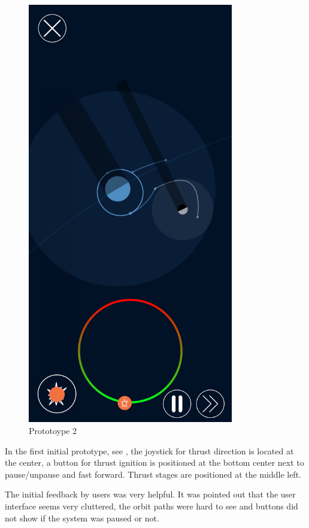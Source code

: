\documentclass[runningheads]{llncs}
\begin{document}
\begin{figure}[!htb]
\begin{minipage}{0.5\textwidth}
      \includegraphics[width=0.8\textwidth]{Prototype2.png}
      \caption{Prototoype 2}
      \label{fig:prot2}
  \end{minipage}
\end{figure}

In the first initial prototype, see , the joystick for thrust direction is located at the center, a button for thrust
ignition is positioned at the bottom center next to pause/unpause and fast forward. Thrust stages are positioned at the middle
left.

The initial feedback by users was very helpful. It was pointed out that the user interface seems very cluttered, the orbit paths 
were hard to see and buttons did not show if the system was paused or not.
\end{document}
